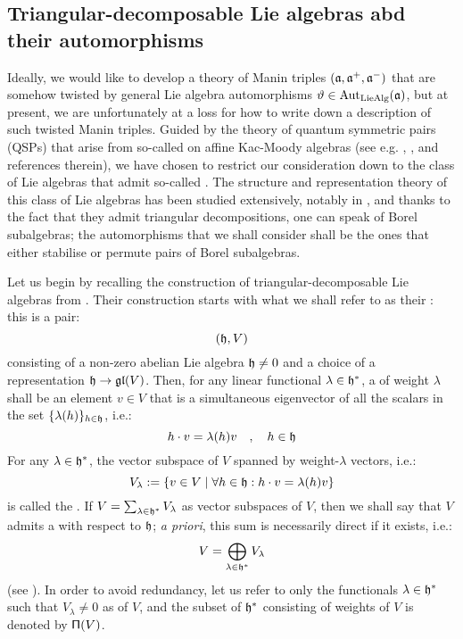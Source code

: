    \subsection{Triangular-decomposable Lie algebras abd their automorphisms}
        Ideally, we would like to develop a theory of Manin triples $(\mathfrak{a}, \mathfrak{a}^+, \mathfrak{a}^-)$ that are somehow twisted by general Lie algebra automorphisms $\vartheta \in \operatorname{Aut}_{\mathrm{Lie}\mathrm{Alg}}(\mathfrak{a})$, but at present, we are unfortunately at a loss for how to write down a description of such twisted Manin triples. Guided by the theory of quantum symmetric pairs (QSPs) that arise from so-called  on affine Kac-Moody algebras (see e.g. \cite{regelskis_vlaar_reflection_matrices_coideal_subalgebras}, \cite{kolb_kac_moody_QSPs}, and references therein), we have chosen to restrict our consideration down to the class of Lie algebras that admit so-called . The structure and representation theory of this class of Lie algebras has been studied extensively, notably in \cite{moody_pianzola_lie_algebras_with_triangular_decompositions}, and thanks to the fact that they admit triangular decompositions, one can speak of Borel subalgebras; the automorphisms that we shall consider shall be the ones that either stabilise or permute pairs of Borel subalgebras.
        
        Let us begin by recalling the construction of triangular-decomposable Lie algebras from \cite[Section 2.1]{moody_pianzola_lie_algebras_with_triangular_decompositions}. Their construction starts with what we shall refer to as their : this is a pair:
            $$(\mathfrak{h}, V)$$
        consisting of a non-zero abelian Lie algebra $\mathfrak{h} \not = 0$ and a choice of a representation $\mathfrak{h} \to \mathfrak{gl}(V)$. Then, for any linear functional $\lambda \in \mathfrak{h}^*$, a  of weight $\lambda$ shall be an element $v \in V$ that is a simultaneous eigenvector of all the scalars in the set $\{ \lambda(h) \}_{h \in \mathfrak{h}}$, i.e.:
            $$h \cdot v = \lambda(h) v \quad, \quad h \in \mathfrak{h}$$
        For any $\lambda \in \mathfrak{h}^*$, the vector subspace of $V$ spanned by weight-$\lambda$ vectors, i.e.:
            $$V_{\lambda} := \{ v \in V \mid \forall h \in \mathfrak{h}: h \cdot v = \lambda(h) v \}$$
        is called the . If $V = \sum_{\lambda \in \mathfrak{h}^*} V_{\lambda}$ as vector subspaces of $V$, then we shall say that $V$ admits a  with respect to $\mathfrak{h}$; \textit{a priori}, this sum is necessarily direct if it exists, i.e.:
            $$V = \bigoplus_{\lambda \in \mathfrak{h}^*} V_{\lambda}$$
        (see \cite[Section 2.1, Proposition 1]{moody_pianzola_lie_algebras_with_triangular_decompositions}). In order to avoid redundancy, let us refer to only the functionals $\lambda \in \mathfrak{h}^*$ such that $V_{\lambda} \not = 0$ as  of $V$, and the subset of $\mathfrak{h}^*$ consisting of weights of $V$ is denoted by $\mathsf{\Pi}(V)$.

